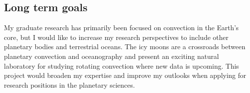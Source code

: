 \documentclass[12pt]{article}
\begin{document}
\subsection{Long term goals}
My graduate research has primarily been focused on convection in the Earth's core, but I would like to increase my research perspectives to include other planetary bodies and terrestrial oceans. The icy moons are a crossroads between planetary convection and oceanography and present an exciting natural laboratory for studying rotating convection where new data is upcoming. This project would broaden my expertise and improve my outlooks when applying for research positions in the planetary sciences.

%
\begin{spacing}{0.4}

\printbibliography

\end{spacing}
\end{document}
